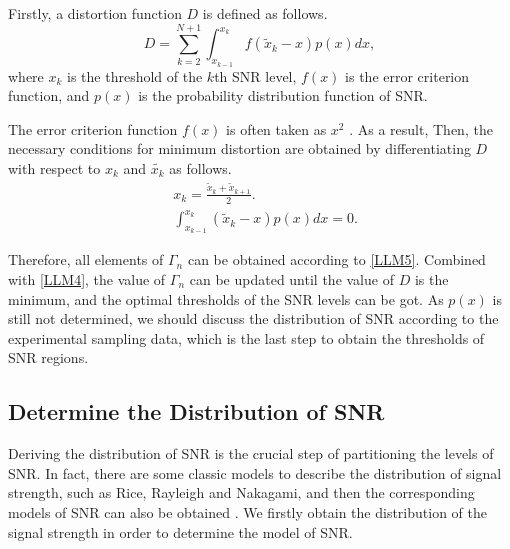 \documentclass[conference]{IEEEtran}
\begin{document}
Firstly, a distortion function $D$ is defined as follows.
\begin{equation}
D=\sum^{N+1}_{k=2}\int ^{x_{k}}_{x_{k-1}}f(\tilde{x}_{k}-x)p(x)dx,
\label{LLM1}
\end{equation}
where $x_{k}$ is the threshold of the $k$th SNR level, $f(x)$ is the error criterion function, and $p(x)$ is the probability distribution function of SNR.





 The error criterion function $f(x)$ is often taken as $x^{2}$ \cite{Digital_communications}. As a result, Then, the necessary conditions for minimum distortion are obtained by differentiating $D$ with respect to ${x_{k}}$ and ${\tilde{x_{k}}}$ as follows.
\begin{eqnarray}
\label{LLM4}
&x_{k}=\frac{\tilde{x}_{k}+\tilde{x}_{k+1}}{2}.\\
\label{LLM5}
&\int^{x_{k}}_{x_{k-1}}(\tilde{x}_{k}-x)p(x)dx=0.
\end{eqnarray}

Therefore, all elements of ${\Gamma_n}$ can be obtained according to \eqref{LLM5}. Combined with \eqref{LLM4}, the value of ${\Gamma_n}$ can be updated until the value of $D$ is the minimum, and the optimal thresholds of the SNR levels can be got.  As $p(x)$ is still not determined,  we should discuss the distribution of SNR according to the experimental sampling data, which is the last step to obtain the thresholds of SNR regions.




\subsection{Determine the Distribution of SNR}

Deriving the distribution of SNR is the crucial step of partitioning the levels of SNR. In fact, there are some classic models to describe the distribution of signal strength, such as Rice, Rayleigh and Nakagami, and then the corresponding models of SNR can also be obtained \cite{Digital_Communication_over_Fading_Channels}. We firstly obtain the distribution of the signal strength in order to determine the model of SNR.
\end{document}

